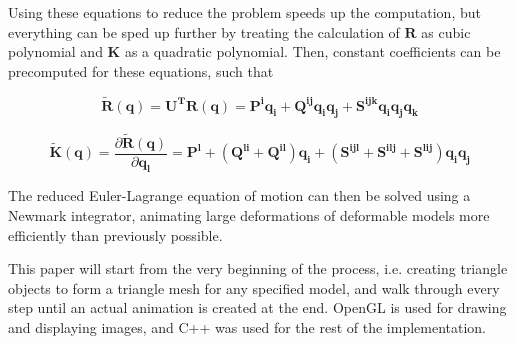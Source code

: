 \documentclass[twocolumn,10pt]{asme2ej}
\begin{document}
Using these equations to reduce the problem speeds up the computation, but everything can be
sped up further by treating the calculation of $\bm{R}$ as cubic polynomial and $\bm{K}$ as a quadratic polynomial. Then,
constant coefficients can be precomputed for these equations, such that

\begin{equation}
\bm{\tilde{R}}(\bm{q}) = \bm{U^{T}R}(\bm{q}) = \bm{P^{i}q_{i}} + \bm{Q^{ij}q_{i}q_{j}} + \bm{S^{ijk}q_{i}q_{j}q_{k}}
\label{eq_rcubicpoly}
\end{equation}

\begin{equation}
\bm{\tilde{K}}(\bm{q}) = \frac{\partial \bm{\tilde{R}}(\bm{q})}{\partial \bm{q_{l}}} = \bm{P^{l}} + (\bm{Q^{li}} + \bm{Q^{il}})\bm{q_{i}} + (\bm{S^{ijl}} + \bm{S^{ilj}} + \bm{S^{lij}} )\bm{q_{i}q_{j}}
\label{eq_rquadpoly}
\end{equation}

The reduced Euler-Lagrange equation of motion can then be solved using a Newmark integrator, animating large deformations
of deformable models more efficiently than previously possible.

This paper will start from the very beginning of the process, i.e. creating triangle objects to form a triangle mesh for any
specified model, and walk through every step until an actual animation is created at the end. OpenGL is used for drawing and displaying images, and C++ was used for the rest of the implementation.
\end{document}
